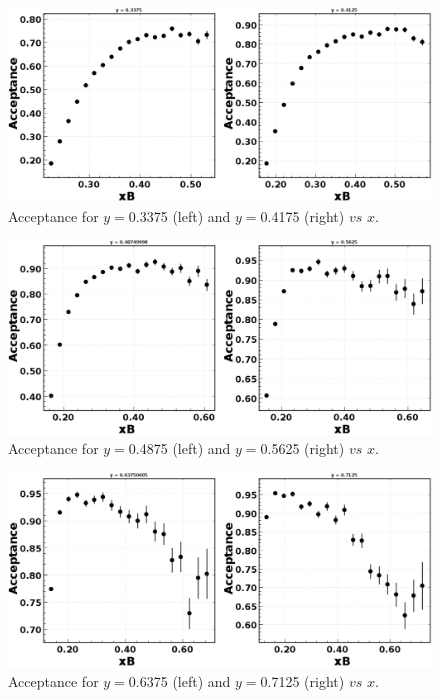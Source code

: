 \begin{figure}[h!]
	\centering
	\includegraphics[width=0.9\linewidth]{figures/rga/acceptance0.png}
	\caption{Acceptance for $y=$0.3375 (left) and $y=$0.4175 (right) $vs$ $x$.}
	\label{fig:rga_acc0}
\end{figure}
\begin{figure}[h!]
	\centering
	\includegraphics[width=0.9\linewidth]{figures/rga/acceptance1.png}
	\caption{Acceptance for $y=$0.4875 (left) and $y=$0.5625 (right) $vs$ $x$.}
	\label{fig:rga_acc1}
\end{figure}
\begin{figure}[h!]
	\centering
	\includegraphics[width=0.9\linewidth]{figures/rga/acceptance2.png}
	\caption{Acceptance for $y=$0.6375 (left) and $y=$0.7125 (right) $vs$ $x$.}
	\label{fig:rga_acc2}
\end{figure}

